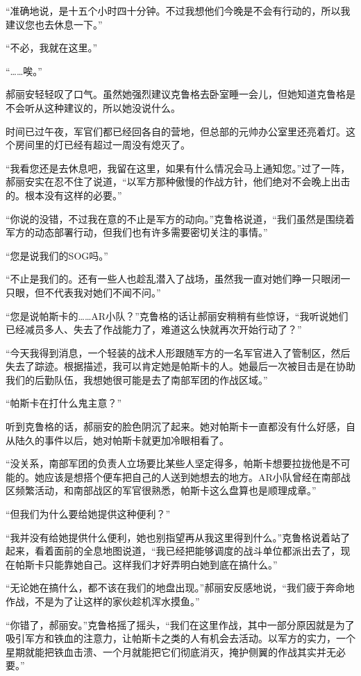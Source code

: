 “准确地说，是十五个小时四十分钟。不过我想他们今晚是不会有行动的，所以我建议您也去休息一下。”

“不必，我就在这里。”

“……唉。”

郝丽安轻轻叹了口气。虽然她强烈建议克鲁格去卧室睡一会儿，但她知道克鲁格是不会听从这种建议的，所以她没说什么。

时间已过午夜，军官们都已经回各自的营地，但总部的元帅办公室里还亮着灯。这个房间里的灯已经有超过一周没有熄灭了。

“我看您还是去休息吧，我留在这里，如果有什么情况会马上通知您。”过了一阵，郝丽安实在忍不住了说道，“以军方那种傲慢的作战方针，他们绝对不会晚上出击的。根本没有这样的必要。”

“你说的没错，不过我在意的不止是军方的动向。”克鲁格说道，“我们虽然是围绕着军方的动态部署行动，但我们也有许多需要密切关注的事情。”

“您是说我们的SOG吗。”

“不止是我们的。还有一些人也趁乱潜入了战场，虽然我一直对她们睁一只眼闭一只眼，但不代表我对她们不闻不问。”

“您是说帕斯卡的……AR小队？”克鲁格的话让郝丽安稍稍有些惊讶，“我听说她们已经减员多人、失去了作战能力了，难道这么快就再次开始行动了？”

“今天我得到消息，一个轻装的战术人形跟随军方的一名军官进入了管制区，然后失去了踪迹。根据描述，我可以肯定她是帕斯卡的人。她最后一次被目击是在协助我们的后勤队伍，我想她很可能是去了南部军团的作战区域。”

“帕斯卡在打什么鬼主意？”

听到克鲁格的话，郝丽安的脸色阴沉了起来。她对帕斯卡一直都没有什么好感，自从陆久的事件以后，她对帕斯卡就更加冷眼相看了。

“没关系，南部军团的负责人立场要比某些人坚定得多，帕斯卡想要拉拢他是不可能的。她应该是想搭个便车把自己的人送到她想去的地方。AR小队曾经在南部战区频繁活动，和南部战区的军官很熟悉，帕斯卡这么盘算也是顺理成章。”

“但我们为什么要给她提供这种便利？”

“我并没有给她提供什么便利，她也别指望再从我这里得到什么。”克鲁格说着站了起来，看着面前的全息地图说道，“我已经把能够调度的战斗单位都派出去了，现在帕斯卡只能靠她自己。这样我们才好弄明白她到底在搞什么。”

“无论她在搞什么，都不该在我们的地盘出现。”郝丽安反感地说，“我们疲于奔命地作战，不是为了让这样的家伙趁机浑水摸鱼。”

“你错了，郝丽安。”克鲁格摇了摇头，“我们在这里作战，其中一部分原因就是为了吸引军方和铁血的注意力，让帕斯卡之类的人有机会去活动。以军方的实力，一个星期就能把铁血击溃、一个月就能把它们彻底消灭，掩护侧翼的作战其实并无必要。”

